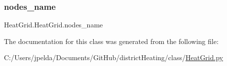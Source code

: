 \subsubsection{\texorpdfstring{nodes\+\_\+name}{nodes\_name}}
{\footnotesize\ttfamily Heat\+Grid.\+Heat\+Grid.\+nodes\+\_\+name}



The documentation for this class was generated from the following file\+:\begin{DoxyCompactItemize}
\item 
C\+:/\+Users/jpelda/\+Documents/\+Git\+Hub/district\+Heating/class/\hyperlink{_heat_grid_8py}{Heat\+Grid.\+py}\end{DoxyCompactItemize}
